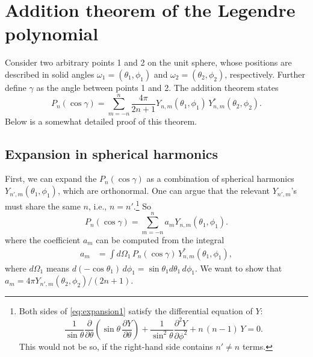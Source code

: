 \documentclass[11pt]{article}
\begin{document}
\section{Addition theorem of the Legendre polynomial}



Consider two arbitrary points 1 and 2 on the unit sphere,
whose positions are described in solid angles
$\omega_1 = (\theta_1, \phi_1)$
and
$\omega_2 = (\theta_2, \phi_2)$, respectively.
%
Further define $\gamma$ as the angle between points 1 and 2.
%
The addition theorem states
\begin{equation}
  P_n(\cos\gamma)
= \sum_{m = -n}^n \frac{ 4 \pi } { 2 n + 1 }
  Y_{n, m}(\theta_1, \phi_1) \, Y_{n, m}^*(\theta_2, \phi_2).
\label{eq:addition}
\end{equation}
Below is a somewhat detailed proof of this theorem.



\subsection{Expansion in spherical harmonics}



First, we can expand the $P_n(\cos\gamma)$
as a combination of spherical harmonics $Y_{n',m}(\theta_1, \phi_1)$,
which are orthonormal.
%
One can argue that the relevant $Y_{n',m}$'s must share the same $n$,
i.e., $n = n'$.\footnote{
  Both sides of \eqref{eq:expansion1}
  satisfy the differential equation of $Y$:
\[
  \frac{ 1 } { \sin \theta }
  \frac{ \partial } { \partial \theta }
  \left(
    \sin \theta
    \,
    \frac{ \partial Y }{ \partial \theta }
  \right)
  +
  \frac { 1 } { \sin^2 \theta }
  \frac { \partial^2 Y } { \partial \phi^2 }
  + n \, (n - 1)  \, Y = 0.
\]
This would not be so,
if the right-hand side contains $n' \ne n$ terms.
}
%
So
\begin{equation}
  P_n(\cos\gamma)
=
  \sum_{m = -n}^n a_m Y_{n, m}(\theta_1, \phi_1).
  \label{eq:expansion1}
\end{equation}
%
where the coefficient $a_m$ can be computed from the integral
\begin{align}
  a_m
&=
\int d\Omega_1 \, P_n(\cos\gamma) \, Y^*_{n,m}(\theta_1, \phi_1),
\label{eq:am1}
\end{align}
where $d\Omega_1$ means
$d(-\cos\theta_1) \, d\phi_1 = \sin\theta_1 d\theta_1 \, d\phi_1$.
%
We want to show that
$a_m = 4 \pi Y_{n',m}(\theta_2, \phi_2)/ ( 2 n + 1 )$.
\end{document}
